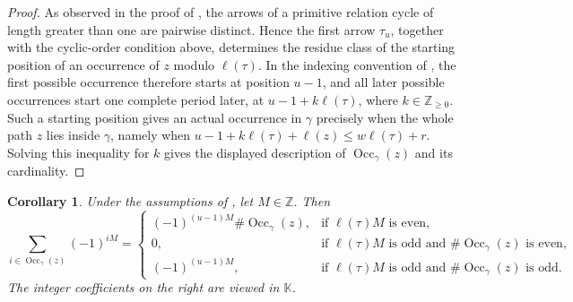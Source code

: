 \documentclass[11pt,a4paper,reqno]{amsart}
\newcommand{\mK}{\mathbb K}
\newcommand{\Occ}{\operatorname{Occ}}
\theoremstyle{plain}
\newtheorem{corollary}[corollary]{Corollary}
\theoremstyle{definition}
\numberwithin{equation}{section}
\begin{document}
	\begin{proof}
		As observed in the proof of , the arrows of a primitive
		relation cycle of length greater than one are pairwise distinct. Hence the
		first arrow $\tau_u$, together with the cyclic-order condition above,
		determines the residue class of the starting position of an occurrence of $z$
		modulo $\ell(\tau)$. In the indexing convention of
		, the first possible occurrence therefore starts at position
		$u-1$, and all later possible occurrences start one complete period later, at
		$u-1+k\ell(\tau)$, where $k\in\mathbb Z_{\geq0}$.
		Such a starting position gives an actual occurrence in $\gamma$ precisely
		when the whole path $z$ lies inside $\gamma$, namely when
		$u-1+k\ell(\tau)+\ell(z)\leq w\ell(\tau)+r$.
		Solving this inequality for $k$ gives the displayed description of
		$\Occ_\gamma(z)$ and its cardinality.
	\end{proof}
	\begin{corollary}
		\label{cor:signed-periodic-multiplicity}
		Under the assumptions of
		, let $M\in\mathbb Z$.  Then
		\[
		\sum_{i\in\Occ_\gamma(z)}(-1)^{iM}
		=
		\begin{cases}
			(-1)^{(u-1)M}\#\Occ_\gamma(z),
			&\text{if }\ell(\tau)M\text{ is even},\\
			0,
			&\text{if }\ell(\tau)M\text{ is odd and }
			\#\Occ_\gamma(z)\text{ is even},\\
			(-1)^{(u-1)M},
			&\text{if }\ell(\tau)M\text{ is odd and }
			\#\Occ_\gamma(z)\text{ is odd}.
		\end{cases}
		\]
		The integer coefficients on the right are viewed in $\mK$.
	\end{corollary}
	
\end{document}
